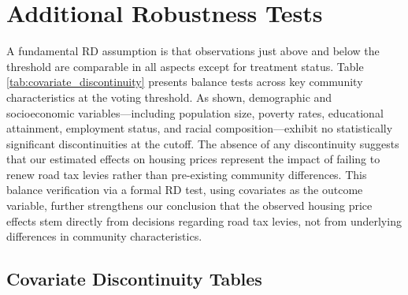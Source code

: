 



\clearpage

\section{Additional Robustness Tests} \label{sec:appxb}

A fundamental RD assumption is that observations just above and below the threshold are comparable in all aspects except for treatment status. Table \ref{tab:covariate_discontinuity} presents balance tests across key community characteristics at the voting threshold. As shown, demographic and socioeconomic variables—including population size, poverty rates, educational attainment, employment status, and racial composition—exhibit no statistically significant discontinuities at the cutoff. The absence of any discontinuity suggests that our estimated effects on housing prices represent the impact of failing to renew road tax levies rather than pre-existing community differences. This balance verification via a formal RD test, using covariates as the outcome variable, further strengthens our conclusion that the observed housing price effects stem directly from decisions regarding road tax levies, not from underlying differences in community characteristics.

\subsection{Covariate Discontinuity Tables}

